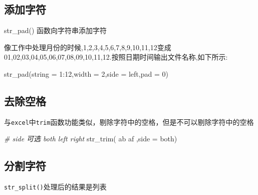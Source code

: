 \documentclass[
]{book}
\newenvironment{Shaded}{\begin{snugshade}}{\end{snugshade}}
\newcommand{\AttributeTok}[1]{\textcolor[rgb]{0.77,0.63,0.00}{#1}}
\newcommand{\CommentTok}[1]{\textcolor[rgb]{0.56,0.35,0.01}{\textit{#1}}}
\newcommand{\DecValTok}[1]{\textcolor[rgb]{0.00,0.00,0.81}{#1}}
\newcommand{\FunctionTok}[1]{\textcolor[rgb]{0.00,0.00,0.00}{#1}}
\newcommand{\NormalTok}[1]{#1}
\newcommand{\SpecialCharTok}[1]{\textcolor[rgb]{0.00,0.00,0.00}{#1}}
\newcommand{\StringTok}[1]{\textcolor[rgb]{0.31,0.60,0.02}{#1}}
\begin{document}
\hypertarget{ux6dfbux52a0ux5b57ux7b26}{%
\subsection{添加字符}\label{ux6dfbux52a0ux5b57ux7b26}}

str\_pad() 函数向字符串添加字符

像工作中处理月份的时候,1,2,3,4,5,6,7,8,9,10,11,12变成01,02,03,04,05,06,07,08,09,10,11,12.按照日期时间输出文件名称,如下所示:

\begin{Shaded}
\begin{Highlighting}[]
\FunctionTok{str\_pad}\NormalTok{(}\AttributeTok{string =} \DecValTok{1}\SpecialCharTok{:}\DecValTok{12}\NormalTok{,}\AttributeTok{width =} \DecValTok{2}\NormalTok{,}\AttributeTok{side =} \StringTok{\textquotesingle{}left\textquotesingle{}}\NormalTok{,}\AttributeTok{pad =} \StringTok{\textquotesingle{}0\textquotesingle{}}\NormalTok{)}
\end{Highlighting}
\end{Shaded}

\hypertarget{ux53bbux9664ux7a7aux683c}{%
\subsection{去除空格}\label{ux53bbux9664ux7a7aux683c}}

与\texttt{excel}中\texttt{trim}函数功能类似，剔除字符中的空格，但是不可以剔除字符中的空格

\begin{Shaded}
\begin{Highlighting}[]
\CommentTok{\# side 可选 both  left right}
\FunctionTok{str\_trim}\NormalTok{(}\StringTok{\textquotesingle{} ab af \textquotesingle{}}\NormalTok{,}\AttributeTok{side =} \StringTok{\textquotesingle{}both\textquotesingle{}}\NormalTok{)}
\end{Highlighting}
\end{Shaded}

\hypertarget{ux5206ux5272ux5b57ux7b26}{%
\subsection{分割字符}\label{ux5206ux5272ux5b57ux7b26}}

\texttt{str\_split()}处理后的结果是列表
\end{document}
